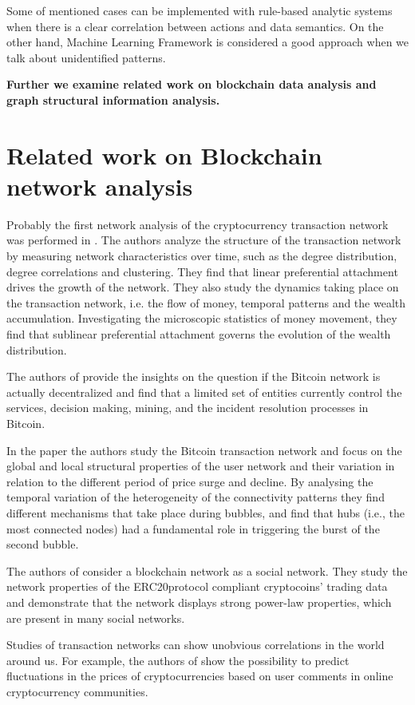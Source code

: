 Some of mentioned cases can be implemented with rule-based analytic systems when there is a clear correlation between actions and data semantics. On the other hand, Machine Learning Framework is considered a good approach when we talk about unidentified patterns.

\textbf{Further we examine related work on blockchain data analysis and graph structural information analysis.}

\section{Related work on Blockchain network analysis}
Probably the first network analysis of the cryptocurrency transaction network was performed in \cite{kondor2014rich}. The authors analyze the structure of the transaction network by measuring network characteristics over time, such as the degree distribution, degree correlations and clustering. They find that linear preferential attachment drives the growth of the network. They also study the dynamics taking place on the transaction network, i.e. the flow of money, temporal patterns and the wealth accumulation. Investigating the microscopic statistics of money movement, they find that sublinear preferential attachment governs the evolution of the wealth distribution.

The authors of \cite{Gervais2014} provide the insights on the question if the Bitcoin network is actually decentralized and find that a limited set of entities currently control the services, decision making, mining, and the incident resolution processes in Bitcoin. 

In the paper \cite{Bovet2018network} the authors study the Bitcoin transaction network and focus on the global and local structural properties of the user network and their variation in relation to the different period of price surge and decline. By analysing the temporal variation of the heterogeneity of the connectivity patterns they find different mechanisms that take place during bubbles, and find that hubs (i.e., the most connected nodes) had a fundamental role in triggering the burst of the second bubble. 

The authors of \cite{somin2018social} consider a blockchain network as a social network. They study the network properties of the ERC20protocol compliant cryptocoins’ trading data and  demonstrate that the network displays strong power-law properties, which are present in many social networks. 

Studies of transaction networks can show unobvious correlations in the world around us. For example, the authors of \cite{Kim2016} show the possibility to predict fluctuations in the prices of cryptocurrencies based on user comments in online cryptocurrency communities.



